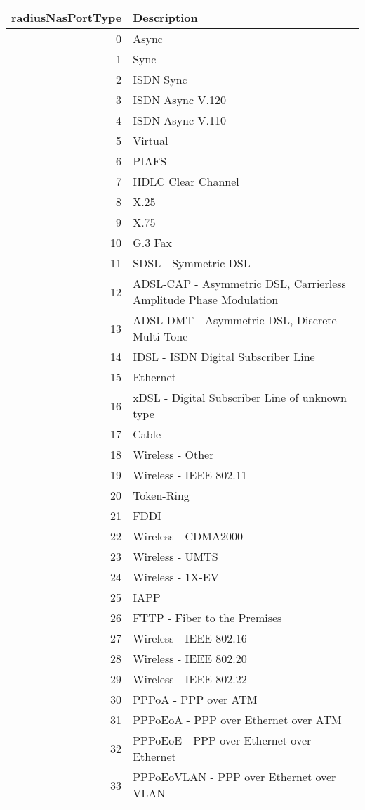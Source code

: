 \documentclass[documentation]{subfiles}
\begin{document}
\begin{longtable}{rl}
    \toprule
    {\bf radiusNasPortType} & {\bf Description}\\
    \midrule\endhead%
     0 & Async\\
     1 & Sync\\
     2 & ISDN Sync\\
     3 & ISDN Async V.120\\
     4 & ISDN Async V.110\\
     5 & Virtual\\
     6 & PIAFS\\
     7 & HDLC Clear Channel\\
     8 & X.25\\
     9 & X.75\\
    10 & G.3 Fax\\
    11 & SDSL - Symmetric DSL\\
    12 & ADSL-CAP - Asymmetric DSL, Carrierless Amplitude Phase Modulation\\
    13 & ADSL-DMT - Asymmetric DSL, Discrete Multi-Tone\\
    14 & IDSL - ISDN Digital Subscriber Line\\
    15 & Ethernet\\
    16 & xDSL - Digital Subscriber Line of unknown type\\
    17 & Cable\\
    18 & Wireless - Other\\
    19 & Wireless - IEEE 802.11\\
    20 & Token-Ring\\
    21 & FDDI\\
    22 & Wireless - CDMA2000\\
    23 & Wireless - UMTS\\
    24 & Wireless - 1X-EV\\
    25 & IAPP\\
    26 & FTTP - Fiber to the Premises\\
    27 & Wireless - IEEE 802.16\\
    28 & Wireless - IEEE 802.20\\
    29 & Wireless - IEEE 802.22\\
    30 & PPPoA - PPP over ATM\\
    31 & PPPoEoA - PPP over Ethernet over ATM\\
    32 & PPPoEoE - PPP over Ethernet over Ethernet\\
    33 & PPPoEoVLAN - PPP over Ethernet over VLAN\\

\end{longtable}
\end{document}
